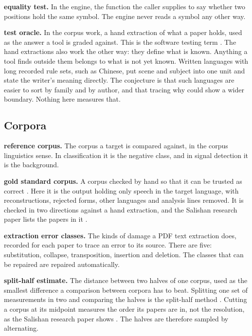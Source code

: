 \noindent\textbf{equality test.} In the engine, the function the caller supplies to say whether two positions hold the same symbol. The engine never reads a symbol any other way.

\noindent\textbf{test oracle.} In the corpus work, a hand extraction of what a paper holds, used as the answer a tool is graded against. This is the software testing term \cite{src:Howden-1978}. The hand extractions also work the other way: they define what is known. Anything a tool finds outside them belongs to what is not yet known. Written languages with long recorded rule sets, such as Chinese, put scene and subject into one unit and state the writer's meaning directly. The conjecture is that such languages are easier to sort by family and by author, and that tracing why could show a wider boundary. Nothing here measures that.

\subsection{Corpora}

\noindent\textbf{reference corpus.} The corpus a target is compared against, in the corpus linguistics sense. In classification it is the negative class, and in signal detection it is the background.

\noindent\textbf{gold standard corpus.} A corpus checked by hand so that it can be trusted as correct \cite{src:Wissler-2014}. Here it is the output holding only speech in the target language, with reconstructions, rejected forms, other languages and analysis lines removed. It is checked in two directions against a hand extraction, and the Salishan research paper lists the papers in it \cite{src:Quigg-Salishan}.

\noindent\textbf{extraction error classes.} The kinds of damage a PDF text extraction does, recorded for each paper to trace an error to its source. There are five: substitution, collapse, transposition, insertion and deletion. The classes that can be repaired are repaired automatically.

\noindent\textbf{split-half estimate.} The distance between two halves of one corpus, used as the smallest difference a comparison between corpora has to beat. Splitting one set of measurements in two and comparing the halves is the split-half method \cite{src:Spearman-1910, src:Brown-1910}. Cutting a corpus at its midpoint measures the order its papers are in, not the resolution, as the Salishan research paper shows \cite{src:Quigg-Salishan}. The halves are therefore sampled by alternating.


